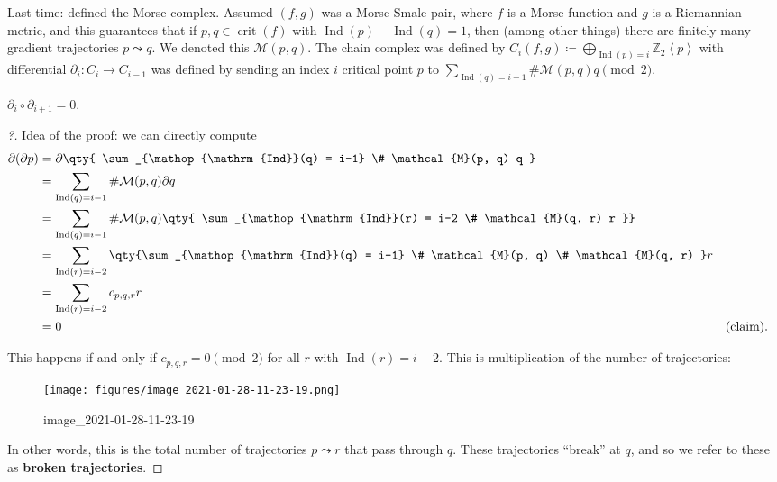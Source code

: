 Last time: defined the Morse complex. Assumed \((f, g)\) was a
Morse-Smale pair, where \(f\) is a Morse function and \(g\) is a
Riemannian metric, and this guarantees that if
\(p, q\in \operatorname{crit}(f)\) with
\(\mathop{\mathrm{Ind}}(p) - \mathop{\mathrm{Ind}}(q) = 1\), then (among
other things) there are finitely many gradient trajectories
\(p\leadsto q\). We denoted this \(\mathcal{M}(p, q)\). The chain
complex was defined by
\(C_i(f, g) \coloneqq\bigoplus_{\mathop{\mathrm{Ind}}(p) = i} {\mathbb{Z}}_2 \left\langle{ p }\right\rangle\)
with differential \({{\partial}}_i: C_i \to C_{i-1}\) was defined by
sending an index \(i\) critical point \(p\) to
\(\sum_{\mathop{\mathrm{Ind}}(q) = i-1} \# \mathcal{M}(p, q) q \pmod 2\).

\begin{theorem}

\({{\partial}}_{i} \circ {{\partial}}_{i+1} = 0\).

\end{theorem}

\begin{proof}[?]

Idea of the proof: we can directly compute
\begin{align*}
{{\partial}}({{\partial}}p) 
&= {{\partial}}\qty{ \sum_{\mathop{\mathrm{Ind}}(q) = i-1} \# \mathcal{M}(p, q) q } \\
&= \sum_{\mathop{\mathrm{Ind}}(q) = i-1} \# \mathcal{M}(p, q) {{\partial}}q \\
&= \sum_{\mathop{\mathrm{Ind}}(q) = i-1} \# \mathcal{M}(p, q) \qty{ \sum_{\mathop{\mathrm{Ind}}(r) = i-2 \# \mathcal{M}(q, r) r  }}   \\
&= \sum_{\mathop{\mathrm{Ind}}(r) = i-2} \qty{\sum_{\mathop{\mathrm{Ind}}(q) = i-1} \# \mathcal{M}(p, q) \# \mathcal{M}(q, r) }  r \\
&= \sum_{\mathop{\mathrm{Ind}}(r) = i-2} c_{p,q,r} r \\
&= 0 && \text{(claim)}
.\end{align*}

This happens if and only if \(c_{p, q, r} = 0 \pmod 2\) for all \(r\)
with \(\mathop{\mathrm{Ind}}(r) = i-2\). This is multiplication of the
number of trajectories:

\begin{figure}
\centering
\texttt{[image: figures/image\_2021-01-28-11-23-19.png]}
\caption{image\_2021-01-28-11-23-19}
\end{figure}

In other words, this is the total number of trajectories \(p\leadsto r\)
that pass through \(q\). These trajectories ``break'' at \(q\), and so
we refer to these as \textbf{broken trajectories}.

\end{proof}

